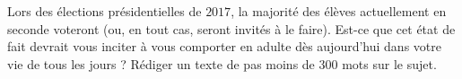 
\begin{exercice}\label{exosmath-0457}

    Lors des élections présidentielles de $2017$, la majorité des élèves actuellement en seconde voteront (ou, en tout cas, seront invités à le faire). Est-ce que cet état de fait devrait vous inciter à vous comporter en adulte dès aujourd'hui dans votre vie de tous les jours ? Rédiger un texte de pas moins de \( 300\) mots sur le sujet.

\end{exercice}
